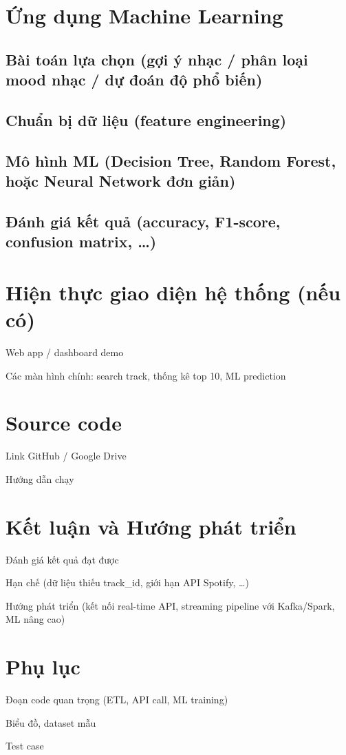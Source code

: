 \documentclass{latex/hcmut-report}
\begin{document}
\section{Ứng dụng Machine Learning}
\subsection{Bài toán lựa chọn (gợi ý nhạc / phân loại mood nhạc / dự đoán độ phổ biến)}
\subsection{Chuẩn bị dữ liệu (feature engineering)}
\subsection{Mô hình ML (Decision Tree, Random Forest, hoặc Neural Network đơn giản)}
\subsection{Đánh giá kết quả (accuracy, F1-score, confusion matrix, …)}

\section{Hiện thực giao diện hệ thống (nếu có)}
Web app / dashboard demo

Các màn hình chính: search track, thống kê top 10, ML prediction

\section{Source code}
Link GitHub / Google Drive

Hướng dẫn chạy

\section{Kết luận và Hướng phát triển}
Đánh giá kết quả đạt được

Hạn chế (dữ liệu thiếu track_id, giới hạn API Spotify, …)

Hướng phát triển (kết nối real-time API, streaming pipeline với Kafka/Spark, ML nâng cao)

\section{Phụ lục}
Đoạn code quan trọng (ETL, API call, ML training)

Biểu đồ, dataset mẫu

Test case
\end{document}
